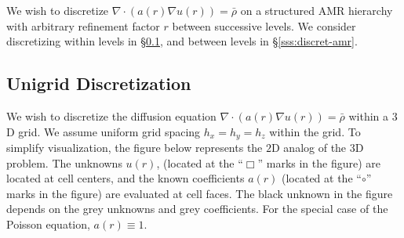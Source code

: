\documentclass[10pt]{article}
\begin{document}
\newcommand{\indvar}{r}
 \newcommand{\uc}{u(\indvar)}

 \newcommand{\uxp}{u(\indvar+h_x)}
 \newcommand{\uxm}{u(\indvar-h_x)}
 \newcommand{\uxph}{u(\indvar+\frac{h_x}{2})}
 \newcommand{\uxmh}{u(\indvar-\frac{h_x}{2})}

 \newcommand{\uyp}{u(\indvar+h_y)}
 \newcommand{\uym}{u(\indvar-h_y)}
 \newcommand{\uyph}{u(\indvar+\frac{h_y}{2})}
 \newcommand{\uymh}{u(\indvar-\frac{h_y}{2})}

 \newcommand{\uzp}{u(\indvar+h_z)}
 \newcommand{\uzm}{u(\indvar-h_z)}
 \newcommand{\uzph}{u(\indvar+\frac{h_z}{2})}
 \newcommand{\uzmh}{u(\indvar-\frac{h_z}{2})}

 \newcommand{\ac}{a(\indvar)}
 \newcommand{\axph}{a(\indvar+\frac{h_x}{2})}
 \newcommand{\axmh}{a(\indvar-\frac{h_x}{2})}
 \newcommand{\ayph}{a(\indvar+\frac{h_y}{2})}
 \newcommand{\aymh}{a(\indvar-\frac{h_y}{2})}
 \newcommand{\azph}{a(\indvar+\frac{h_z}{2})}
 \newcommand{\azmh}{a(\indvar-\frac{h_z}{2})}

 \newcommand{\alc}{\alpha_{0}}
 \newcommand{\alxp}{\alpha_{x}}
 \newcommand{\alxm}{\alpha_{\bar{x}}}
 \newcommand{\alyp}{\alpha_{y}}
 \newcommand{\alym}{\alpha_{\bar{y}}}
 \newcommand{\alzp}{\alpha_{z}}
 \newcommand{\alzm}{\alpha_{\bar{z}}}

 \newcommand{\Uc}{U_{0}}
 \newcommand{\Uxp}{U_{x}}
 \newcommand{\Uxm}{U_{\bar{x}}}
 \newcommand{\Uyp}{U_{y}}
 \newcommand{\Uym}{U_{\bar{y}}}
 \newcommand{\Uzp}{U_{z}}
 \newcommand{\Uzm}{U_{\bar{z}}}

We wish to discretize $\nabla\cdot(\ac \nabla \uc) = \bar{\rho}$
on a structured AMR hierarchy with arbitrary refinement factor $r$
between successive levels.  We consider discretizing within levels in
\S\ref{sss:discret-unigrid}, and between
levels in \S\ref{sss:discret-amr}.

\subsection{Unigrid Discretization} \label{sss:discret-unigrid}

We wish to discretize the diffusion equation $\nabla\cdot(\ac \nabla
\uc) = \bar{\rho}$ within a $3$D grid.  We assume uniform
grid spacing $h_{x} = h_{y} = h_{z}$ within the grid.  To simplify
visualization, the figure below represents the $2$D analog of the $3$D
problem.  The unknowns $u(r)$, (located at the ``$\Box$'' marks in the
figure) are located at cell centers, and the known coefficients $a(r)$
(located at the ``$\circ$'' marks in the figure) are evaluated at cell
faces.  The black unknown in the figure depends on the grey unknowns
and grey coefficients.  For the special case of the Poisson equation,
$a(r)\equiv 1$.
\end{document}
